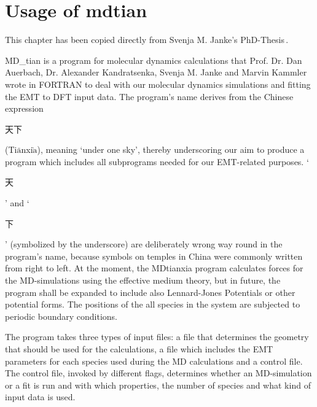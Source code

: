 \documentclass[twoside, 11pt, titlepage, captions=nooneline, a4paper, headsepline]{scrbook}%
\newcommand{\9}{\mathrm}
\newcommand{\0}{\,\mathrm}
\begin{document}
\chapter{Usage of mdtian}
\label{Sec:usage:MDtian}
This chapter has been copied directly from Svenja M. Janke's PhD-Thesis\,\cite{svenjaphd}.

MD\_tian is a program for molecular dynamics calculations that Prof. Dr. Dan Auerbach, Dr. Alexander Kandratsenka, Svenja M. Janke and Marvin Kammler wrote in FORTRAN to deal with our molecular dynamics simulations and fitting the EMT to DFT input data. The program's name derives from the Chinese expression
\begin{CJK*}{UTF8}{gbsn}
天下
\end{CJK*}
(Ti$\bar{\mathrm{a}}$nxi$\grave{\mathrm{a}}$), meaning `under one sky', thereby underscoring our aim to produce a program which includes all subprograms needed for our EMT-related purposes. `\begin{CJK*}{UTF8}{gbsn}
天
\end{CJK*}' and `\begin{CJK*}{UTF8}{gbsn}
下
\end{CJK*}' (symbolized by the underscore) are deliberately wrong way round in the program's name, because symbols on temples in China were commonly written from right to left.
At the moment, the MDtianxia program calculates forces for the MD-simulations using the effective medium theory, but in future, the program shall be expanded to include also Lennard-Jones Potentials or other potential forms. 
The positions of the all species in the system are subjected to periodic boundary conditions.

The program takes three types of input files: a file that determines the geometry that should be used for the calculations, a file which includes the EMT parameters for each species used during the MD calculations and a control file. The control file, invoked by different flags, determines whether an MD-simulation or a fit is run and with which properties, the number of species and what kind of input data is used.
\end{document}
